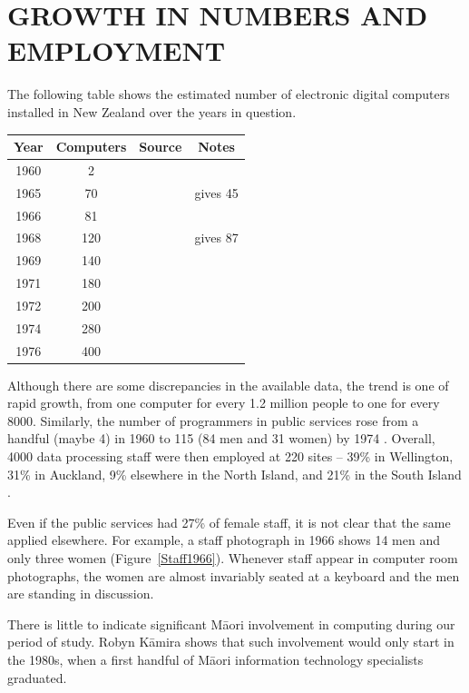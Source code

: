 \documentclass{IEEEcsmag}
\begin{document}
\vspace*{-8pt}
\section{GROWTH IN NUMBERS AND EMPLOYMENT}

The following table shows the estimated number of electronic digital computers installed in New Zealand over the years in question.

\begin{center}
\begin{tabular}{ |c|c|c|c| } 
 \hline
 Year & Computers & Source & Notes\\ 
\hline
1960 & 2 & \cite{FirstCinNZ}&\\ 
1965 & 70 & \cite{Beardon} & \cite{HoneHeke} gives 45\\ 
1966 & 81 & \cite{Beardon}&\\
1968 & 120 & \cite{Beardon} & \cite{Yearbook75} gives 87\\
1969 & 140 & \cite{Beardon}&\\
1971 & 180 & \cite{Beardon}&\\
1972 & 200 & \cite{Yearbook75}&\\
1974 & 280 & \cite{Beardon}&\\
1976 & 400 & \cite{Beardon}&\\
 \hline
\end{tabular}
\end{center}

Although there are some discrepancies in the available data, the trend is one of rapid growth, from one computer for every 1.2 million people to one for every 8000. Similarly, the number of programmers in public services rose from a handful (maybe 4) in 1960 to 115 (84 men and
31 women) by 1974 \cite{Yearbook75}. Overall, 4000 data processing staff were then employed at  220 sites -- 39\% in Wellington, 31\% in Auckland, 9\% elsewhere in the North Island, and 21\% in the South Island \cite{Beardon}.

Even if the public services had 27\% of female staff, it is not clear that the same applied elsewhere. For example, a staff photograph in 1966 shows 14 men and only three women (Figure~\ref{Staff1966}). Whenever staff appear in computer room photographs, the women are almost invariably seated at a keyboard and the men are standing in discussion.

There is little to indicate significant Māori involvement in computing during our period of study.
Robyn Kāmira \cite{Kamira} shows that such involvement would only start in the 1980s, when a first handful
of Māori information technology specialists graduated.
\end{document}
